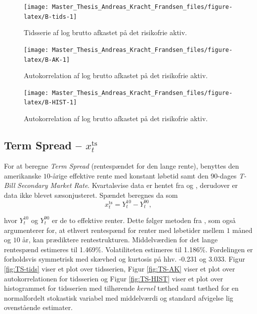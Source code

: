 \documentclass[
  a4paper,
  oneside]{memoir}
\begin{document}
\begin{figure}[htbp!]

{\centering \texttt{[image: Master\_Thesis\_Andreas\_Kracht\_Frandsen\_files/figure-latex/B-tids-1]} 

}

\caption{Tidsserie af log brutto afkastet på det risikofrie aktiv.}\label{fig:B-tids}
\end{figure}

\begin{figure}[htbp!]

{\centering \texttt{[image: Master\_Thesis\_Andreas\_Kracht\_Frandsen\_files/figure-latex/B-AK-1]} 

}

\caption{Autokorrelation af log brutto afkastet på det risikofrie aktiv.}\label{fig:B-AK}
\end{figure}

\begin{figure}[htbp!]

{\centering \texttt{[image: Master\_Thesis\_Andreas\_Kracht\_Frandsen\_files/figure-latex/B-HIST-1]} 

}

\caption{Autokorrelation af log brutto afkastet på det risikofrie aktiv.}\label{fig:B-HIST}
\end{figure}

\hypertarget{term-spread-x_ttextts}{%
\subsection{\texorpdfstring{Term Spread -- \(x_t^{\text{ts}}\)}{Term Spread -- x\_t\^{}\{\textbackslash text\{ts\}\}}}\label{term-spread-x_ttextts}}

For at beregne \emph{Term Spread} (rentespændet for den lange rente), benyttes den amerikanske \(10\)-årige effektive rente med konstant løbetid samt den 90-dages \emph{T-Bill} \emph{Secondary Market Rate}. Kvartalsvise data er hentet fra \citep{FRED102020} og \citep{FRED902020}, derudover er data ikke blevet sæsonjusteret. Spændet beregnes da som
\[x_t^{\text{ts}}=Y_t^{10}-Y_t^{90},\]

hvor \(Y_t^{10}\) og \(Y_t^{90}\) er de to effektive renter. Dette følger metoden fra \citep{Campbell1991}, som også argumenterer for, at ethvert rentespænd for renter med løbetider mellem \(1\) måned og \(10\) år, kan prædiktere rentestrukturen. Middelværdien for det lange rentespænd estimeres til 1.469\(\%\). Volatiliteten estimeres til 1.186\(\%\). Fordelingen er forholdsvis symmetrisk med skævhed og kurtosis på hhv. -0.231 og 3.033. Figur \ref{fig:TS-tids} viser et plot over tidsserien, Figur \ref{fig:TS-AK} viser et plot over autokorrelationen for tidsserien og Figur \ref{fig:TS-HIST} viser et plot over histogrammet for tidsserien med tilhørende \emph{kernel} tæthed samt tæthed for en normalfordelt stokastisk variabel med middelværdi og standard afvigelse lig ovenstående estimater.
\end{document}
